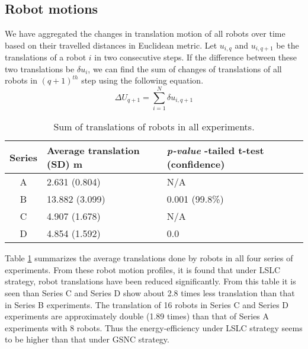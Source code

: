 \documentclass[journal]{IEEEtran}
\begin{document}
\subsection{Robot motions}
We have aggregated the changes in translation motion of all robots over time based on their travelled distances in Euclidean metric. Let $u_{i,q}$ and $u_{i,q+1}$ be the translations of a robot $i$ in two consecutive steps. If the difference between these two translations be $\delta u_{i}$, we can find the sum of changes of translations of all robots in $(q+1)^{th}$ step using the following equation.
\begin{equation}
\Delta U_{q+1} = \sum_{i=1}^{N} \delta u_{i, q+1} 
\label{eqn:Delta-Tr}
\end{equation}
\begin{table}
\begin{small}
\begin{center}
\caption{Sum of translations of robots in all experiments.}
\begin{tabular}{|c|p{1in}|p{0.9in}|}
\hline Series & Average \protect\newline translation \protect\newline(SD) m & \textit{p-value} \protect\newline 1-tailed t-test (confidence)\\ 
\hline A & 2.631 (0.804) & N/A\\ 
\hline B & 13.882 (3.099) & 0.001 (99.8\%)\\
\hline C & 4.907 (1.678) & N/A\\
\hline D  & 4.854  (1.592) & 0.0\\
\hline
\end{tabular}
\label{table:motion-cmp} 
\end{center}
\end{small}
\vspace*{-0.8cm}
\end{table}
Table \ref{table:motion-cmp} summarizes the average translations done by robots in all four series of experiments. From these robot motion profiles, it is found that under LSLC strategy, robot translations have been reduced significantly. From this table it is seen than Series C and Series D show about 2.8 times less translation than that in Series B experiments. The translation of 16 robots in Series C and Series D experiments are approximately double (1.89 times) than that of Series A experiments with 8 robots.  Thus the energy-efficiency under LSLC strategy seems to be higher  than that under GSNC strategy.
\end{document}
